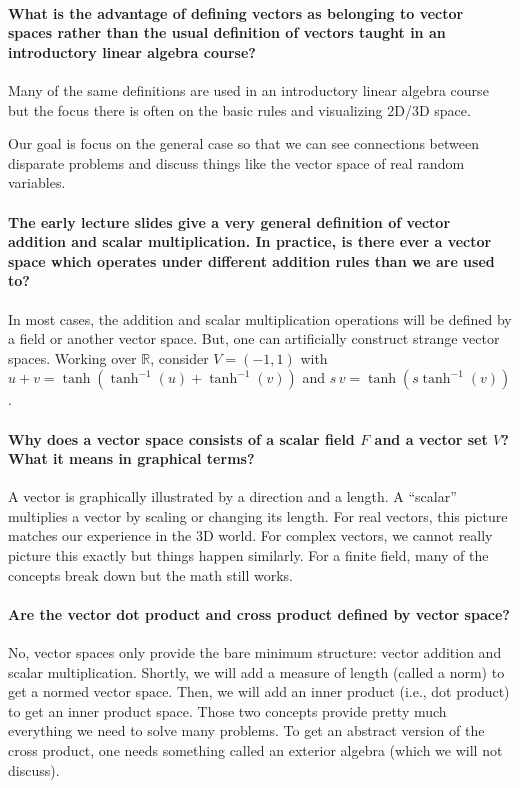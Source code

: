 \documentclass[10pt,english]{article}
\begin{document}
\paragraph{What is the advantage of defining vectors as belonging to vector spaces rather than the usual definition of vectors taught in an introductory linear algebra course?}

Many of the same definitions are used in an introductory linear algebra course but the focus there is often on the basic rules and visualizing 2D/3D space.

Our goal is focus on the general case so that we can see connections between disparate problems and discuss things like the vector space of real random variables.

\paragraph{The early lecture slides give a very general definition of vector addition and scalar multiplication. In practice, is there ever a vector space which operates under different addition rules than we are used to?}

In most cases, the addition and scalar multiplication operations will be defined by a field or another vector space.
But, one can artificially construct strange vector spaces.
Working over $\mathbb{R}$, consider $V=(-1,1)$ with
$u+v = \tanh (\tanh^{-1}(u)+\tanh^{-1} (v))$ and $s\, v = \tanh(s\tanh^{-1}(v))$.

\paragraph{Why does a vector space consists of a scalar field $F$ and a vector set $V$? What it means in graphical terms?}

A vector is graphically illustrated by a direction and a length.
A ``scalar'' multiplies a vector by scaling or changing its length.
For real vectors, this picture matches our experience in the 3D world.
For complex vectors, we cannot really picture this exactly but things happen similarly.
For a finite field, many of the concepts break down but the math still works.


\paragraph{Are the vector dot product and cross product defined by vector space?}

No, vector spaces only provide the bare minimum structure: vector addition and scalar multiplication.
Shortly, we will add a measure of length (called a norm) to get a normed vector space.
Then, we will add an inner product (i.e., dot product) to get an inner product space.
Those two concepts provide pretty much everything we need to solve many problems.
To get an abstract version of the cross product, one needs something called an exterior algebra (which we will not discuss).
\end{document}
